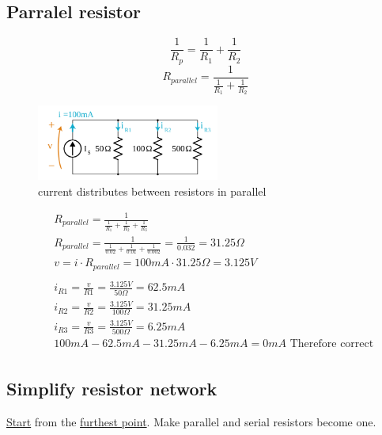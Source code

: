 \documentclass{article}
\begin{document}
\newpage
\subsection{Parralel resistor}
\begin{equation} \frac{1}{R_p} = \frac{1}{R_1} + \frac{1}{R_2} \end{equation}
\begin{equation} R_{parallel} = \frac{1}{\frac{1}{R_1} + \frac{1}{R_2}} \end{equation}

\begin{figure}[h]
    \vspace{10mm}
    \centering
    \includegraphics[width=6cm]{image/current-distributes-between-resistors-in-parallel.png}
    \caption{current distributes between resistors in parallel}
\end{figure}

\begin{align*}
  &\quad R_{parallel} = \frac{1}{\frac{1}{R_1} + \frac{1}{R_2} + \frac{1}{R_3}} \\
  &\quad R_{parallel} = \frac{1}{\frac{1}{0.02} + \frac{1}{0.01} + \frac{1}{0.002}} =
  \frac{1}{0.032} = 31.25\Omega \\
  &\quad v=i\cdot{R_{parallel}} = 100mA\cdot{31.25\Omega} = 3.125V \\
  &\quad \\
  &\quad i_{R1} = \frac{v}{R1} = \frac{3.125V}{50\Omega} = 62.5mA \\
  &\quad i_{R2} = \frac{v}{R2} = \frac{3.125V}{100\Omega} = 31.25mA \\
  &\quad i_{R3} = \frac{v}{R3} = \frac{3.125V}{500\Omega} = 6.25mA \\
  &\quad 100mA -62.5mA -31.25mA -6.25mA = 0mA \text{ Therefore correct }\\
\end{align*}


\subsection{Simplify resistor network}
\underline{Start} from the \underline{furthest point}. Make parallel and serial resistors become one.
\end{document}
